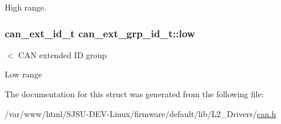 High range. 

\subsubsection[{\texorpdfstring{low}{low}}]{\setlength{\rightskip}{0pt plus 5cm}can\+\_\+ext\+\_\+id\+\_\+t can\+\_\+ext\+\_\+grp\+\_\+id\+\_\+t\+::low}\hypertarget{structcan__ext__grp__id__t_a7c123b7e277f204b82144552a55d93af}{}\label{structcan__ext__grp__id__t_a7c123b7e277f204b82144552a55d93af}


$<$ C\+AN extended ID group 

Low range 

The documentation for this struct was generated from the following file\+:\begin{DoxyCompactItemize}
\item 
/var/www/html/\+S\+J\+S\+U-\/\+D\+E\+V-\/\+Linux/firmware/default/lib/\+L2\+\_\+\+Drivers/\hyperlink{can_8h}{can.\+h}\end{DoxyCompactItemize}
